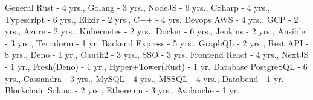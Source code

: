 
\begin{cvskills}
    \cvskill
        {General}
        {Rust - 4 yrs., Golang - 3 yrs., NodeJS - 6 yrs., CSharp - 4 yrs., Typescript - 6 yrs., Elixir - 2 yrs., C++ - 4 yrs.}
    \cvskill
        {Devops}
        {AWS - 4 yrs., GCP - 2 yrs., Azure - 2 yrs., Kubernetes - 2 yrs., Docker - 6 yrs., Jenkins - 2 yrs., Ansible - 3 yrs., Terraform - 1 yr.}
    \cvskill
        {Backend}
        {Express - 5 yrs., GraphQL - 2 yrs., Rest API - 8 yrs., Deno - 1 yr., Oauth2 - 3 yrs., SSO - 3 yrs.}
    \cvskill
        {Frontend}
        {React - 4 yrs., NextJS - 1 yr., Fresh(Deno) - 1 yr., Hyper+Tower(Rust) - 1 yr.}
    \cvskill
        {Database}
        {PostgreSQL - 6 yrs., Cassandra - 3 yrs., MySQL - 4 yrs., MSSQL - 4 yrs., Databend - 1 yr.}
    \cvskill
        {Blockchain}
        {Solana - 2 yrs., Ethereum - 3 yrs., Avalanche -  1 yr.}        
\end{cvskills}
